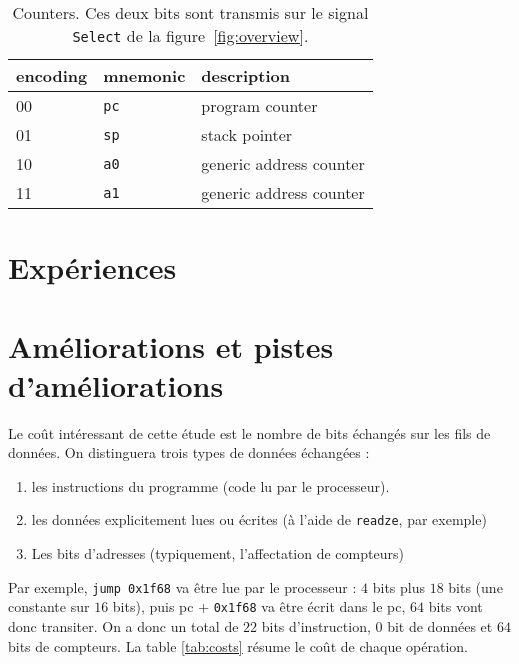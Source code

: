 \documentclass[architecture]{compas2018}
\begin{document}
\begin{table} 
  \caption{Counters. Ces deux bits sont transmis sur le signal \texttt{Select} de la figure~\ref{fig:overview}. }
  \label{tab:counters}
\begin{center}
  \begin{tabular}{|l|l|l|}
    \hline  
  encoding  & mnemonic & description \\
    \hline  
    \hline  
    00& \texttt{pc} &  program counter\\
    \hline
    01& \texttt{sp} & stack pointer\\
    \hline
    10& \texttt{a0} &  generic address counter\\
    \hline
    11& \texttt{a1} &  generic address counter\\
    \hline
  \end{tabular}
\end{center}
\end{table}


\section{Expériences}

\section{Améliorations et pistes d'améliorations}

Le coût intéressant de cette étude est le nombre de bits échangés sur les fils de données. On distinguera trois types de données échangées : 
\begin{enumerate}
\item les instructions du programme (code lu par le processeur).
\item les données explicitement lues ou écrites (à l'aide de \texttt{readze}, par exemple)
\item Les bits d'adresses (typiquement, l'affectation de compteurs)
\end{enumerate}

Par exemple, \texttt{jump 0x1f68} va être lue par le processeur : $4$ bits plus $18$ bits (une constante sur $16$ bits), puis pc + \texttt{0x1f68} va être écrit dans le pc, $64$ bits vont donc transiter. On a donc un total de $22$ bits d'instruction, $0$ bit de données et $64$ bits de compteurs.
La table \ref{tab:costs} résume le coût de chaque opération.
\end{document}
